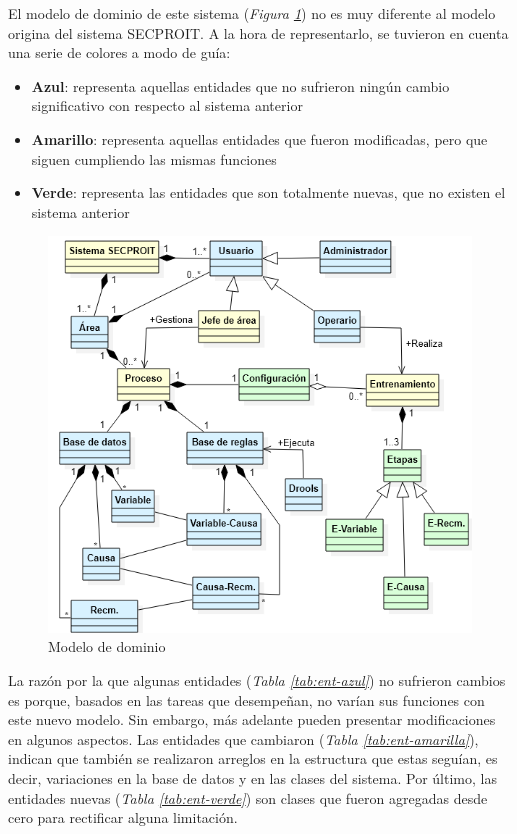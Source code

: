 El modelo de dominio de este sistema (\textsl{Figura \ref{fig:dominio}}) no es muy diferente al modelo origina del sistema SECPROIT. A la hora de representarlo, se tuvieron en cuenta una serie de colores a modo de guía:

\begin{itemize}
\item \textbf{Azul}: representa aquellas entidades que no sufrieron ningún cambio significativo con respecto al sistema anterior
\item \textbf{Amarillo}: representa aquellas entidades que fueron modificadas, pero que siguen cumpliendo las mismas funciones
\item \textbf{Verde}: representa las entidades que son totalmente nuevas, que no existen el sistema anterior
\end{itemize}

\begin{figure}[h]
\centering
 \includegraphics[width=0.7\linewidth]{imagen/dominio.png}
 \caption{Modelo de dominio}
 \label{fig:dominio} 
\end{figure}

La razón por la que algunas entidades (\textsl{Tabla \ref{tab:ent-azul}})  no sufrieron cambios es porque, basados en las tareas que desempeñan, no varían sus funciones con este nuevo modelo. Sin embargo, más adelante pueden presentar modificaciones en algunos aspectos.
Las entidades que cambiaron (\textsl{Tabla \ref{tab:ent-amarilla}}), indican que también se realizaron arreglos en la estructura que estas seguían, es decir, variaciones en la base de datos y en las clases del sistema.
Por último, las entidades nuevas (\textsl{Tabla \ref{tab:ent-verde}}) son clases que fueron agregadas desde cero para rectificar alguna limitación.


